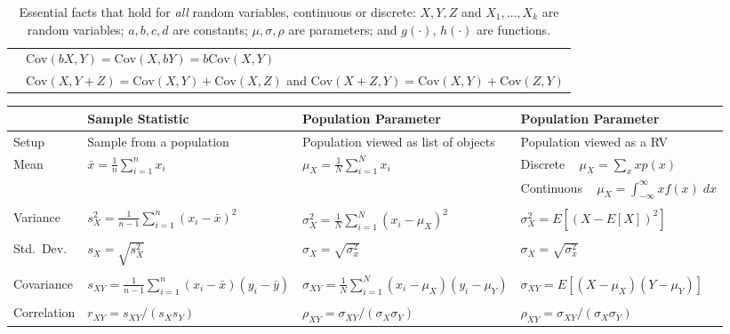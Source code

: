 \documentclass[12pt]{article}
\begin{document}
\begin{sidewaystable}
\begin{tabular}{l|l}
& $\text{Cov}(bX, Y) = \text{Cov}(X, bY) = b \text{Cov}(X,Y)$ \\
& $\text{Cov}(X, Y + Z) = \text{Cov}(X,Y) + \text{Cov}(X, Z)$ and $\text{Cov}(X + Z, Y) = \text{Cov}(X,Y) + \text{Cov}(Z,Y)$ \\
\hline
\end{tabular}
\caption{Essential facts that hold for \emph{all} random variables, continuous or discrete: $X, Y, Z$ and $X_1, \dots, X_k$ are random variables; $a, b, c, d$ are constants; $\mu, \sigma, \rho$ are parameters; and $g(\cdot)$, $h(\cdot)$ are functions.}
\end{sidewaystable}


\begin{sidewaystable}
\centering
\begin{tabular}{l|l|l|l}
&Sample Statistic & Population Parameter & Population Parameter\\
\hline
Setup & Sample from a population&  Population viewed as list of objects& Population viewed as a RV\\
Mean &$\bar{x} = \displaystyle\frac{1}{n}\sum_{i=1}^n x_i$&$\displaystyle \mu_X = \frac{1}{N}\sum_{i=1}^N x_i$&Discrete $\;\;\; \displaystyle \mu_X = \sum_{x}xp(x)$\\
&&&Continuous $\;\;\; \mu_X = \int_{-\infty}^\infty xf(x)\; dx$\\
&&&\\
Variance &$\displaystyle s_X^2 = \frac{1}{n-1} \sum_{i=1}^n (x_i - \bar{x})^2$&$\displaystyle \sigma_X^2 = \frac{1}{N} \sum_{i=1}^N (x_i - \mu_X)^2$& $\sigma^2_X = E\left[\left(X - E[X]\right)^2 \right]$\\
&&&\\
Std.\ Dev.\ &$s_X = \sqrt{s^2_X}$&$\sigma_X = \sqrt{\sigma^2_x}$&$\sigma_X = \sqrt{\sigma^2_x}$\\
&&&\\
Covariance &$\displaystyle s_{XY} = \frac{1}{n-1} \sum_{i=1}^n (x_i -\bar{x})(y_i - \bar{y})$&$\sigma_{XY} = \displaystyle \frac{1}{N} \sum_{i=1}^N (x_i -\mu_X)(y_i - \mu_Y)$&$\sigma_{XY} = E\left[ \left(X - \mu_X \right) \left(Y - \mu_Y \right)  \right]$ \\
&&&\\
Correlation &$r_{XY} = s_{XY}/(s_X s_Y)$&$\rho_{XY} = \sigma_{XY}/(\sigma_X \sigma_Y)$& $\rho_{XY} = \sigma_{XY}/(\sigma_X \sigma_Y)$\\
\hline
\end{tabular}

\end{sidewaystable}
\end{document}
